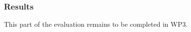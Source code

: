 
\subsubsection*{Results}

This part of the evaluation remains to be completed in WP3.

%
%
%


\clearpage

